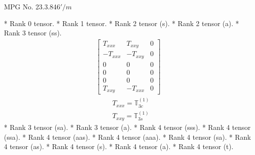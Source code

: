 \documentclass[fleqn,8pt,landscape]{jsarticle}
\begin{document}
\setcounter{MaxMatrixCols}{32}

\renewcommand{\tablename}{Table~}
\renewcommand{\figurename}{Figure~}
\begin{center}
\LARGE
MPG No. 23.3.84\quad$6'/m$
\end{center}
* Rank 0 tensor.
* Rank 1 tensor.
* Rank 2 tensor (s).
* Rank 2 tensor (a).
* Rank 3 tensor (ss).
\begin{align*}
\begin{bmatrix} T_{xxx} & T_{xxy} & 0 \\ - T_{xxx} & - T_{xxy} & 0 \\ 0 & 0 & 0 \\ 0 & 0 & 0 \\ 0 & 0 & 0 \\ T_{xxy} & - T_{xxx} & 0 \end{bmatrix}
\end{align*}
\begin{align*}
& T_{xxx} = \mathbb{T}_{3c}^{(1)} \\
& T_{xxy} = \mathbb{T}_{3s}^{(1)}
\end{align*}
* Rank 3 tensor (sa).
* Rank 3 tensor (a).
* Rank 4 tensor (sss).
* Rank 4 tensor (ssa).
* Rank 4 tensor (aas).
* Rank 4 tensor (aaa).
* Rank 4 tensor (sa).
* Rank 4 tensor (as).
* Rank 4 tensor (s).
* Rank 4 tensor (a).
* Rank 4 tensor (t).
\end{document}

